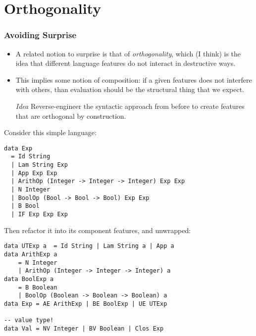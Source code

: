 \documentclass{beamer}
\begin{document}
\section{Orthogonality}

\begin{frame}[fragile]
  \frametitle{Avoiding Surprise}
  \begin{itemize}

  \item A related notion to surprise is that of \emph{orthogonality}, which (I
    think) is the idea that different language features do not interact in
    destructive ways.

  \item This implies some notion of composition: if a given features does
    not interfere with others, than evaluation should be the structural thing
    that we expect. 

  \item[\emph{Idea}] Reverse-engineer the syntactic approach from before to
    create features that are orthogonal by construction.

  \end{itemize}

\end{frame}
\begin{frame}[fragile]
  Consider this simple language:
\begin{verbatim}
data Exp 
  = Id String 
  | Lam String Exp 
  | App Exp Exp 
  | ArithOp (Integer -> Integer -> Integer) Exp Exp 
  | N Integer
  | BoolOp (Bool -> Bool -> Bool) Exp Exp
  | B Bool
  | IF Exp Exp Exp
\end{verbatim}
\end{frame}

\begin{frame}[fragile]
  Then refactor it into its component features, and unwrapped:
  \begin{verbatim}
data UTExp a  = Id String | Lam String a | App a
data ArithExp a  
    = N Integer 
    | ArithOp (Integer -> Integer -> Integer) a
data BoolExp a 
    = B Boolean 
    | BoolOp (Boolean -> Boolean -> Boolean) a
data Exp = AE ArithExp | BE BoolExp | UE UTExp

-- value type!
data Val = NV Integer | BV Boolean | Clos Exp
\end{verbatim}

\end{frame}
\end{document}
